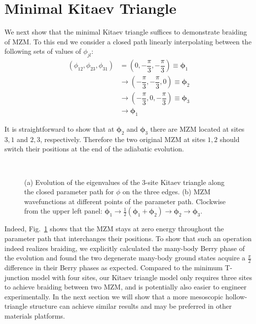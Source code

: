 \section{Minimal Kitaev Triangle}

We next show that the minimal Kitaev triangle suffices to demonstrate braiding of MZM. To this end we consider a closed path linearly interpolating between the following sets of values of $\phi_{jl}$:
\begin{align}
  (\phi_{12}, \phi_{23}, \phi_{31}) &= \left( 0, -\dfrac{\pi}{3}, -\dfrac{\pi}{3} \right) \equiv \bm\phi_1 \nonumber \\
  &\rightarrow \left( -\dfrac{\pi}{3}, -\dfrac{\pi}{3}, 0 \right) \equiv \bm\phi_2 \nonumber \\
  &\rightarrow \left( -\dfrac{\pi}{3}, 0, -\dfrac{\pi}{3} \right) \equiv \bm\phi_3 \nonumber \\
  &\rightarrow \bm\phi_1
\end{align}

It is straightforward to show that at $\bm \phi_{2}$ and $\bm \phi_3$ there are MZM located at sites $3,1$ and $2,3$, respectively.
Therefore the two original MZM at sites $1,2$ should switch their positions at the end of the adiabatic evolution.

\begin{figure}[ht]
  \centering
  \hspace{-25pt}
  \\
  \caption{(a) Evolution of the eigenvalues of the 3-site Kitaev triangle along the closed parameter path for $\phi$ on the three edges. (b) MZM wavefunctions at different points of the parameter path. Clockwise from the upper left panel: $\bm \phi_1 \rightarrow \frac{1}{2}(\bm \phi_1 + \bm \phi_2)\rightarrow \bm \phi_2\rightarrow \bm\phi_3$.}
  \label{fig:3eig}
\end{figure}

Indeed, Fig.~\ref{fig:3eig} shows that the MZM stays at zero energy throughout the parameter path that interchanges their positions.
To show that such an operation indeed realizes braiding, we explicitly calculated the many-body Berry phase of the evolution and found the two degenerate many-body ground states acquire a $\frac{\pi}{2}$ difference in their Berry phases as expected.
Compared to the minimum T-junction model with four sites, our Kitaev triangle model only requires three sites to achieve braiding between two MZM, and is potentially also easier to engineer experimentally.
In the next section we will show that a more mesoscopic hollow-triangle structure can achieve similar results and may be preferred in other materials platforms.

